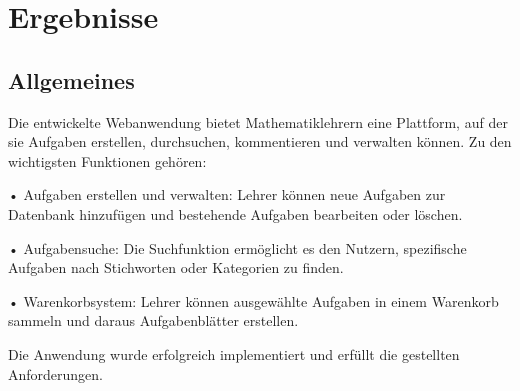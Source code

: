 \section{Ergebnisse}
\subsection{Allgemeines}

Die entwickelte Webanwendung bietet Mathematiklehrern eine Plattform, auf der sie Aufgaben erstellen, durchsuchen, kommentieren und verwalten können. Zu den wichtigsten Funktionen gehören:

•	Aufgaben erstellen und verwalten: Lehrer können neue Aufgaben zur Datenbank hinzufügen und bestehende Aufgaben bearbeiten oder löschen.

•	Aufgabensuche: Die Suchfunktion ermöglicht es den Nutzern, spezifische Aufgaben nach Stichworten oder Kategorien zu finden.

•	Warenkorbsystem: Lehrer können ausgewählte Aufgaben in einem Warenkorb sammeln und daraus Aufgabenblätter erstellen.

Die Anwendung wurde erfolgreich implementiert und erfüllt die gestellten Anforderungen.



